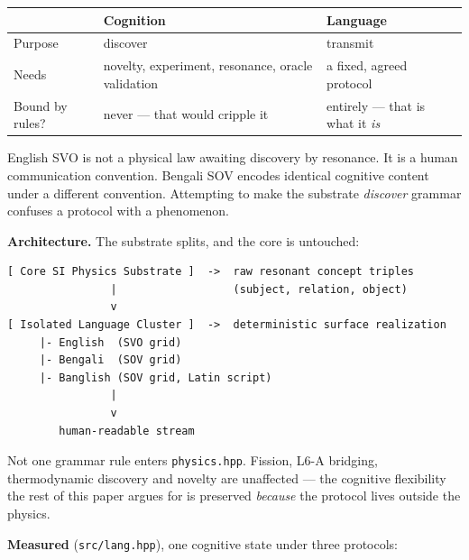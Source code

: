 \documentclass[
  11pt,
  a4paper,
]{article}
\begin{document}
\begin{longtable}[]{@{}
  >{\raggedright\arraybackslash}p{}
  >{\raggedright\arraybackslash}p{}
  >{\raggedright\arraybackslash}p{}@{}}
\toprule\noalign{}
\begin{minipage}[b]{\linewidth}\raggedright
\end{minipage} & \begin{minipage}[b]{\linewidth}\raggedright
Cognition
\end{minipage} & \begin{minipage}[b]{\linewidth}\raggedright
Language
\end{minipage} \\
\midrule\noalign{}
\endhead
\bottomrule\noalign{}
\endlastfoot
Purpose & discover & transmit \\
Needs & novelty, experiment, resonance, oracle validation & a fixed,
agreed protocol \\
Bound by rules? & never --- that would cripple it & entirely --- that is
what it \emph{is} \\
\end{longtable}

English SVO is not a physical law awaiting discovery by resonance. It is
a human communication convention. Bengali SOV encodes identical
cognitive content under a different convention. Attempting to make the
substrate \emph{discover} grammar confuses a protocol with a phenomenon.

\textbf{Architecture.} The substrate splits, and the core is untouched:

\begin{verbatim}
[ Core SI Physics Substrate ]  ->  raw resonant concept triples
                |                  (subject, relation, object)
                v
[ Isolated Language Cluster ]  ->  deterministic surface realization
     |- English  (SVO grid)
     |- Bengali  (SOV grid)
     |- Banglish (SOV grid, Latin script)
                |
                v
        human-readable stream
\end{verbatim}

Not one grammar rule enters \texttt{physics.hpp}. Fission, L6-A
bridging, thermodynamic discovery and novelty are unaffected --- the
cognitive flexibility the rest of this paper argues for is preserved
\emph{because} the protocol lives outside the physics.

\textbf{Measured} (\texttt{src/lang.hpp}), one cognitive state under
three protocols:
\end{document}
